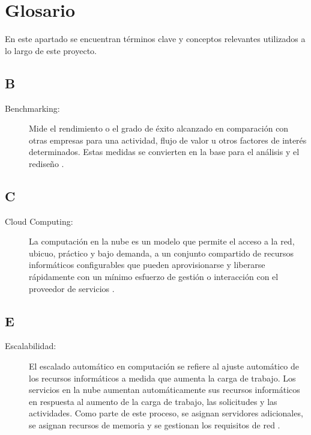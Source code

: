 \chapter*{Glosario}

En este apartado se encuentran términos clave y conceptos relevantes utilizados a lo largo de este proyecto.

\section*{B}
\begin{description}
  \item[Benchmarking:] Mide el rendimiento o el grado de éxito alcanzado en comparación con otras empresas para una actividad, flujo de valor u otros factores de interés determinados. Estas medidas se convierten en la base para el análisis y el rediseño \citep{PeterWootton2024}.
\end{description}

\section*{C}
\begin{description}
  \item[Cloud Computing:] La computación en la nube es un modelo que permite el acceso a la red, ubicuo, práctico y bajo demanda, a un conjunto compartido de recursos informáticos configurables que pueden aprovisionarse y liberarse rápidamente con un mínimo esfuerzo de gestión o interacción con el proveedor de servicios \citep{Mell2011}.
\end{description}

\section*{E}
\begin{description}
  \item[Escalabilidad:] El escalado automático en computación se refiere al ajuste automático de los recursos informáticos a medida que aumenta la carga de trabajo. Los servicios en la nube aumentan automáticamente sus recursos informáticos en respuesta al aumento de la carga de trabajo, las solicitudes y las actividades. Como parte de este proceso, se asignan servidores adicionales, se asignan recursos de memoria y se gestionan los requisitos de red \citep{TARI2024100650}.
\end{description}

